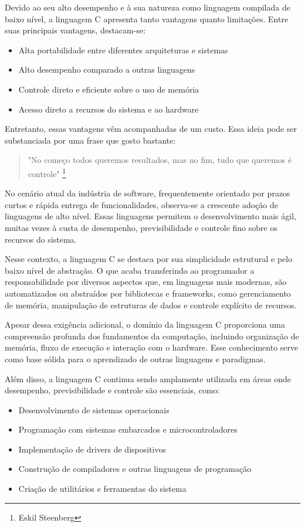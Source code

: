 Devido ao seu alto desempenho e à sua natureza como linguagem compilada de baixo 
nível, a linguagem C apresenta tanto vantagens quanto limitações. Entre suas 
principais vantagens, destacam-se:

\begin{itemize}
        \renewcommand{\labelitemi}{\tiny$\blacksquare$}
    \item Alta portabilidade entre diferentes arquiteturas e sistemas
    \item Alto desempenho comparado a outras linguagens
    \item Controle direto e eficiente sobre o uso de memória
    \item Acesso direto a recursos do sistema e ao hardware
\end{itemize}

Entretanto, essas vantagens vêm acompanhadas de um custo. Essa ideia pode ser 
substanciada por uma frase que gosto bastante:

\begin{quote}
"No começo todos queremos resultados, mas no fim, tudo que queremos é controle"
\footnote{Eskil Steenberg}
\end{quote}

No cenário atual da indústria de software, frequentemente orientado por prazos curtos 
e rápida entrega de funcionalidades, observa-se a crescente adoção de linguagens de 
alto nível. Essas linguagens permitem o desenvolvimento mais ágil, muitas vezes à 
custa de desempenho, previsibilidade e controle fino sobre os recursos do sistema.

Nesse contexto, a linguagem C se destaca por sua simplicidade estrutural e pelo baixo 
nível de abstração. O que acaba transferindo ao programador a responsabilidade 
por diversos aspectos que, em linguagens mais modernas, são automatizados ou abstraídos 
por bibliotecas e frameworks, como gerenciamento de memória, manipulação de estruturas 
de dados e controle explícito de recursos.

Apesar dessa exigência adicional, o domínio da linguagem C proporciona uma compreensão 
profunda dos fundamentos da computação, incluindo organização de memória, fluxo de 
execução e interação com o hardware. Esse conhecimento serve como base sólida para o 
aprendizado de outras linguagens e paradigmas.

Além disso, a linguagem C continua sendo amplamente utilizada em áreas onde desempenho, 
previsibilidade e controle são essenciais, como:

\begin{itemize}
        \renewcommand{\labelitemi}{\tiny$\blacksquare$}
    \item Desenvolvimento de sistemas operacionais
    \item Programação com sistemas embarcados e microcontroladores
    \item Implementação de drivers de dispositivos
    \item Construção de compiladores e outras linguagens de programação
    \item Criação de utilitários e ferramentas do sistema
\end{itemize}
